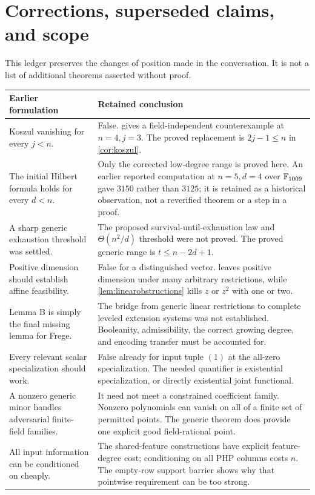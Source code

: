 \chapter{Corrections, superseded claims, and scope}\label{app:ledger}
This ledger preserves the changes of position made in the conversation. It is not a list of additional theorems asserted without proof.

\begin{longtable}{@{}L{0.29\textwidth}L{0.65\textwidth}@{}}
\toprule
Earlier formulation & Retained conclusion\\\midrule
\endhead
Koszul vanishing for every $j<n$. & False.  gives a field-independent counterexample at $n=4,j=3$. The proved replacement is $2j-1\le n$ in \cref{cor:koszul}.\\
The initial Hilbert formula holds for every $d<n$. & Only the corrected low-degree range is proved here. An earlier reported computation at $n=5,d=4$ over $\mathbb F_{1009}$ gave $3150$ rather than $3125$; it is retained as a historical observation, not a reverified theorem or a step in a proof.\\
A sharp generic exhaustion threshold was settled. & The proposed survival-until-exhaustion law and $\Theta(n^2/d)$ threshold were not proved. The proved generic range is $t\le n-2d+1$.\\
Positive dimension should establish affine feasibility. & False for a distinguished vector.  leaves positive dimension under many arbitrary restrictions, while \cref{lem:linearobstructions} kills $z$ or $z^2$ with one or two.\\
Lemma B is simply the final missing lemma for Frege. & The bridge from generic linear restrictions to complete leveled extension systems was not established. Booleanity, admissibility, the correct growing degree, and encoding transfer must be accounted for.\\
Every relevant scalar specialization should work. & False already for input tuple $(1)$ at the all-zero specialization. The needed quantifier is existential specialization, or directly existential joint functional.\\
A nonzero generic minor handles adversarial finite-field families. & It need not meet a constrained coefficient family. Nonzero polynomials can vanish on all of a finite set of permitted points. The generic theorem does provide one explicit good field-rational point.\\
All input information can be conditioned on cheaply. & The shared-feature constructions have explicit feature-degree cost; conditioning on all PHP columns costs $n$. The empty-row support barrier shows why that pointwise requirement can be too strong.\\

\end{longtable}
